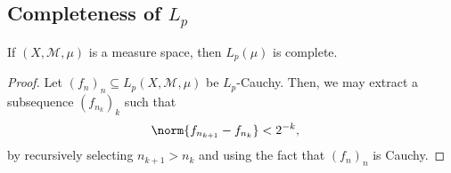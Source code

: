 \documentclass[10pt]{mypackage}
\begin{document}
\subsection{Completeness of $L_p$}%
\begin{theorem}
  If $\left( X,\mathcal{M},\mu \right)$ is a measure space, then $L_p\left( \mu \right)$ is complete.
\end{theorem}
\begin{proof}
  Let $\left( f_n \right)_n\subseteq L_p\left( X,\mathcal{M},\mu \right)$ be $L_p$-Cauchy. Then, we may extract a subsequence $\left( f_{n_{k}} \right)_k$ such that
  \begin{align*}
    \norm{f_{n_{k+1}}-f_{n_{k}}} &< 2^{-k},
  \end{align*}
  by recursively selecting $n_{k+1} > n_{k}$ and using the fact that $\left( f_n \right)_n$ is Cauchy.\newline


\end{proof}
\end{document}
